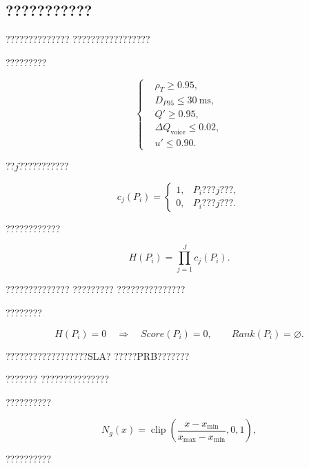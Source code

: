 \subsection*{???????????}

??????????????
?????????????????

?????????

\begin{equation}
\left\{
\begin{aligned}
&\rho_T\geq0.95,\\
&D_{P95}\leq30~\mathrm{ms},\\
&Q'\geq0.95,\\
&\Delta Q_{\mathrm{voice}}\leq0.02,\\
&u'\leq0.90.
\end{aligned}
\right.
\label{eq:hard_constraints_reduced}
\end{equation}

??$j$???????????

\begin{equation}
c_j(P_i)
=
\begin{cases}
1,
& P_i\text{???$j$???},\\
0,
& P_i\text{???$j$???}.
\end{cases}
\label{eq:constraint_indicator_reduced}
\end{equation}

????????????

\begin{equation}
H(P_i)
=
\prod_{j=1}^{J}
c_j(P_i).
\label{eq:policy_feasibility_reduced}
\end{equation}

??????????????
?????????
???????????????

????????

\begin{equation}
H(P_i)=0
\quad\Longrightarrow\quad
Score(P_i)=0,
\qquad
Rank(P_i)=\varnothing.
\label{eq:infeasible_policy_reduced}
\end{equation}

??????????????????SLA?
?????PRB???????

???????
???????????????

??????????

\begin{equation}
N_g(x)
=
\operatorname{clip}
\left(
\frac{x-x_{\min}}
{x_{\max}-x_{\min}},
0,
1
\right),
\label{eq:gain_normalization_reduced}
\end{equation}

??????????

